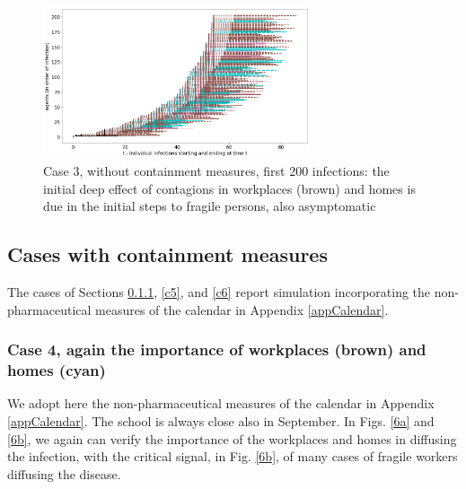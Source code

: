 \documentclass[11pt]{article}
\begin{document}
\begin{figure}[H]
\begin{center}
\includegraphics[width=0.7\textwidth]{no5b.png}%
\caption{Case 3, without containment measures, first 200 infections: the initial deep effect of contagions in workplaces (brown) and homes is due in the initial steps to fragile persons, also asymptomatic}
\label{5b}
\end{center}
\end{figure}

\subsection{Cases with containment measures}

The cases of Sections \ref{c4}, \ref{c5}, and \ref {c6} report simulation incorporating the non-pharmaceutical measures of the calendar in Appendix \ref{appCalendar}.

\subsubsection{Case 4, again the importance of workplaces (brown) and homes (cyan)}
\label{c4}

We adopt here the non-pharmaceutical measures of the calendar in Appendix \ref{appCalendar}. The school is always close also in September. 
In Figs. \ref{6a} and \ref{6b}, we again can verify the importance of the workplaces and homes in diffusing the infection, with the critical signal, in Fig. \ref{6b}, of many cases of fragile workers diffusing the disease.
\end{document}
